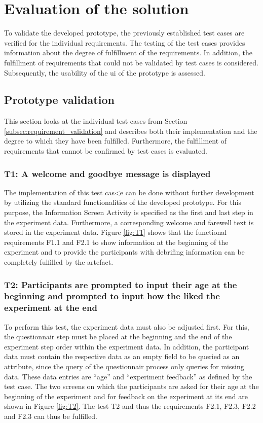 \newpage\section{Evaluation of the solution}

To validate the developed prototype, the previously established test cases are verified for the individual requirements. The testing of the test cases provides information about the degree of fulfillment of the requirements. In addition, the fulfillment of requirements that could not be validated by test cases is considered. Subsequently, the usability of the \ac{ui} of the prototype is assessed.

\subsection{Prototype validation}
This section looks at the individual test cases from Section \ref{subsec:requirement_validation} and describes both their implementation and the degree to which they have been fulfilled. Furthermore, the fulfillment of requirements that cannot be confirmed by test cases is evaluated. 

\subsubsection*{T1: A welcome and goodbye message is displayed} 

The implementation of this test cas<e can be done without further development by utilizing the standard functionalities of the developed prototype. For this purpose, the Information Screen Activity is specified as the first and last step in the experiment data. Furthermore, a corresponding welcome and farewell text is stored in the experiment data. Figure \ref{fig:T1} shows that the functional requirements F1.1 and F2.1 to show information at the beginning of the experiment and to provide the participants with debrifing information can be completely fulfilled by the artefact.

\subsubsection*{T2: Participants are prompted to input their age at the beginning and prompted to input how the liked the experiment at the end}

To perform this test, the experiment data must also be adjusted first. For this, the questionnair step must be placed at the beginning and the end of the experiment step order within the experiment data. In addition, the participant data must contain the respective data as an empty field to be queried as an attribute, since the query of the questionnair process only queries for missing data. These data entries are \enquote{age} and \enquote{experiment feedback} as defined by the test case. The two screens on which the participants are asked for their age at the beginning of the experiment and for feedback on the experiment at its end are shown in Figure \ref{fig:T2}. The test T2 and thus the requirements F2.1, F2.3, F2.2 and F2.3 can thus be fulfilled.

